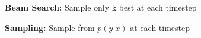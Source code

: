 \textbf{Beam Search:} Sample only k best at each timestep\\
\begin{comment}
	This is a greedy approach, but does quite well in practice.\\
\end{comment} 

\textbf{Sampling:} Sample from $p(y|x)$ at each timestep\\
\begin{comment}
	Evaluation of these methods is very difficult, it can't be done by maximizing the log-likelihood. 
	There is the BLEU score, counts the fraction of n-grams that appear in the reference prediction, and the METEOR score, whatever this is doing.\\
\end{comment} 









